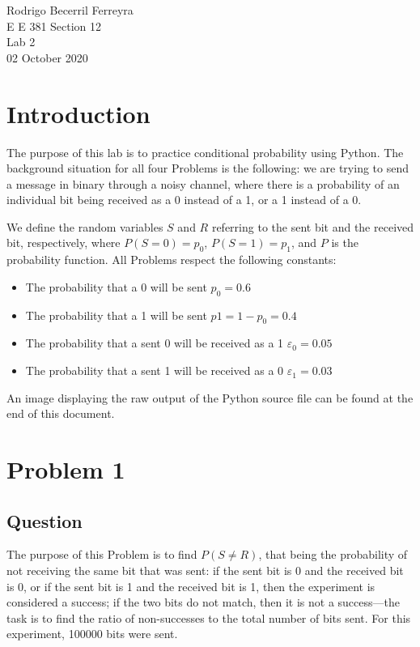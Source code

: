 \documentclass{article}
\begin{document}
    \noindent
    Rodrigo Becerril Ferreyra\\
    E E 381 Section 12\\
    Lab 2\\
    02 October 2020

\section*{Introduction} The purpose of this lab is to practice
conditional probability using Python. The background situation
for all four Problems is the following: we are trying to
send a message in binary through a noisy channel, where there
is a probability of an individual bit being received as a 0
instead of a 1, or a 1 instead of a 0.

We define the random variables \(S\) and \(R\)
referring to the sent bit and the received bit, respectively,
where \(P(S = 0) = p_0\), \(P(S = 1) = p_1\),
and \(P\) is the probability function. All
Problems respect the following constants:
\begin{itemize}
    \item The probability that a 0 will be sent \(p_0 = 0.6\)
    \item The probability that a 1 will be sent
    \(p1 = 1-p_0 = 0.4\)
    \item The probability that a sent 0 will be received as
    a 1 \(\varepsilon_0 = 0.05\)
    \item The probability that a sent 1 will be received as
    a 0 \(\varepsilon_1 = 0.03\)
\end{itemize}

An image displaying the raw output of the Python source file
can be found at the end of this document.

\section{Problem 1}
\subsection{Question} The purpose of this Problem is to find
\(P(S \ne R)\), that being the probability of not receiving the
same bit that was sent: if the sent bit is 0 and the received
bit is 0, or if the sent bit is 1 and the received bit is 1,
then the experiment is considered a success; if the two bits
do not match, then it is not a success---the task is to
find the ratio of non-successes to the total number of
bits sent. For this experiment, \num{100000} bits were sent.
\end{document}
